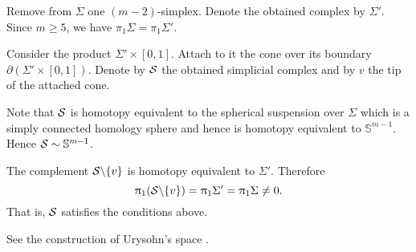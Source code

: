 Remove from $\Sigma$ one $(m-2)$-simplex.
Denote the obtained complex by $\Sigma'$.
Since $m\ge 5$, we have $\pi_1\Sigma=\pi_1\Sigma'$.

Consider the product $\Sigma'\times [0,1]$. 
Attach to it the cone over its boundary $\partial (\Sigma'\times [0,1])$.
Denote by $\mathcal{S}$ the obtained simplicial complex
and by $v$ the tip of the attached cone.

Note that $\mathcal{S}$ is homotopy equivalent to the spherical suspension over $\Sigma$ which is a simply connected homology sphere and hence is homotopy equivalent to $\mathbb{S}^{m-1}$.
  Hence  $\mathcal{S}\sim\mathbb{S}^{m-1}$.

The complement $\mathcal{S}\backslash\{v\}$ is homotopy equivalent to $\Sigma'$.
Therefore 
\[
\uppi_1(\mathcal{S}\backslash\{v\})
=\uppi_1\Sigma'
=\uppi_1\Sigma\ne 0.
\]
That is, $\mathcal{S}$ satisfies the conditions above.

 See the construction of Urysohn's space \cite[3.11$\tfrac{3}{2}_+$]{gromov-MS}.
